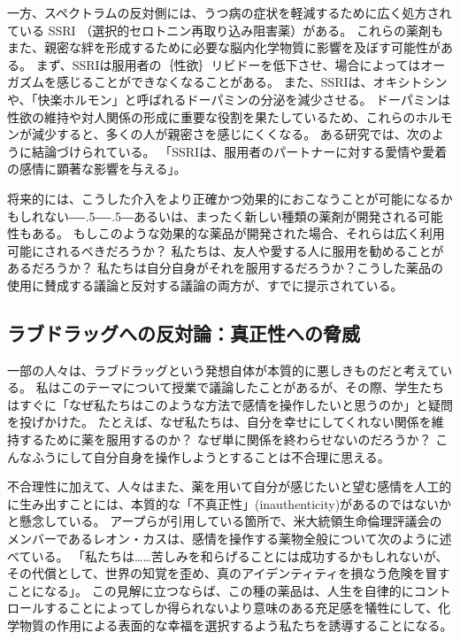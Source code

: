 \documentclass[paper=a4,book,openany]{jlreq}
\def\DDASH{―\kern-.5\zw―\kern-.5\zw―} %
\begin{document}
一方、スペクトラムの反対側には、うつ病の症状を軽減するために広く処方されている SSRI （選択的セロトニン再取り込み阻害薬）がある。
これらの薬剤もまた、親密な絆を形成するために必要な脳内化学物質に影響を及ぼす可能性がある。
まず、SSRIは服用者の｛性欲｝{リビドー}を低下させ、場合によってはオーガズムを感じることができなくなることがある。
また、SSRIは、オキシトシンや、「快楽ホルモン」と呼ばれるドーパミンの分泌を減少させる。
ドーパミンは性欲の維持や対人関係の形成に重要な役割を果たしているため、これらのホルモンが減少すると、多くの人が親密さを感じにくくなる。
ある研究では、次のように結論づけられている。
「SSRIは、服用者のパートナーに対する愛情や愛着の感情に顕著な影響を与える」\citep{marazzitia14:_dimor_chang_some_featur_lovin}。

将来的には、こうした介入をより正確かつ効果的におこなうことが可能になるかもしれない{\DDASH}あるいは、まったく新しい種類の薬剤が開発される可能性もある。
もしこのような効果的な薬品が開発された場合、それらは広く利用可能にされるべきだろうか？ 私たちは、友人や愛する人に服用を勧めることがあるだろうか？ 私たちは自分自身がそれを服用するだろうか？こうした薬品の使用に賛成する議論と反対する議論の両方が、すでに提示されている。

\subsection{ラブドラッグへの反対論：真正性への脅威}

一部の人々は、ラブドラッグという発想自体が本質的に悪しきものだと考えている。
私はこのテーマについて授業で議論したことがあるが、その際、学生たちはすぐに「なぜ私たちはこのような方法で感情を操作したいと思うのか」と疑問を投げかけた。
たとえば、なぜ私たちは、自分を幸せにしてくれない関係を維持するために薬を服用するのか？ なぜ単に関係を終わらせないのだろうか？
こんなふうにして自分自身を操作しようとすることは不合理に思える。

不合理性に加えて、人々はまた、薬を用いて自分が感じたいと望む感情を人工的に生み出すことには、本質的な「不真正性」(inauthenticity)があるのではないかと懸念している。
アープらが引用している箇所で、米大統領生命倫理評議会のメンバーであるレオン・カスは、感情を操作する薬物全般について次のように述べている。
「私たちは……苦しみを和らげることには成功するかもしれないが、その代償として、世界の知覚を歪め、真のアイデンティティを損なう危険を冒すことになる」\citep[p.227]{kass03:_beyon_therap}。
この見解に立つならば、この種の薬品は、人生を自律的にコントロールすることによってしか得られないより意味のある充足感を犠牲にして、化学物質の作用による表面的な幸福を選択するよう私たちを誘導することになる。
\end{document}
